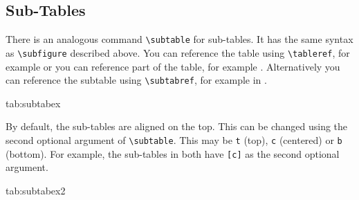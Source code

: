 \documentclass[mlmain]{jmlr}
\begin{document}
\subsection{Sub-Tables}
\label{sec:subtables}
There is an analogous command \verb|\subtable| for sub-tables.
It has the same syntax as \verb|\subfigure| described above.
You can reference the table using \verb|\tableref|, for example
 or you can reference part of the table,
for example . Alternatively you can reference the
subtable using \verb|\subtabref|, for example
 in .

\begin{table}[htbp]
\floatconts
 {tab:subtabex}
 {\caption{An Example With Sub-Tables}}
 {%
   \qquad
 }
\end{table}

By default, the sub-tables are aligned on the top.
This can be changed using the second optional argument
of \verb|\subtable|. This may be \texttt{t} (top), \texttt{c}
(centered) or \texttt{b} (bottom). For example, the sub-tables
 in 
both have \verb|[c]| as the second optional argument.

\begin{table}[htbp]
\floatconts
 {tab:subtabex2}
 {\caption{Another Example With Sub-Tables}}
 {%
   \qquad
 }
\end{table}
\end{document}
